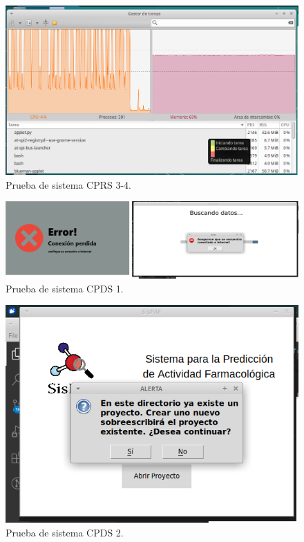 \begin{figure}[H]
    \centering
    \includegraphics[scale=0.60]{Capitulo4/Documentos/Casos_de_sistema/imagenes_casos/ResultadosFinalesEste.png}
    \caption{Prueba de sistema CPRS 3-4.}
    \label{Evidencia3-4}
\end{figure}

\begin{figure}[H]
    \centering
    \includegraphics[scale=0.35]{Capitulo4/Documentos/Casos_de_sistema/imagenes_casos/errorNet.png}
    \caption{Prueba de sistema CPDS 1.}
    \label{Evidencia8}
\end{figure}

\begin{figure}[H]
    \centering
    \includegraphics[scale=0.60]{Capitulo4/Documentos/Casos_de_sistema/imagenes_casos/RemplazoP.png}
    \caption{Prueba de sistema CPDS 2.}
    \label{Evidencia9}
\end{figure}

